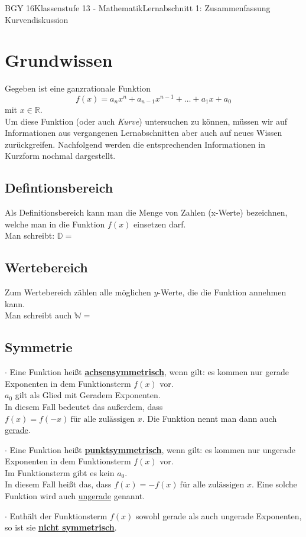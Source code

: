 \documentclass[11pt,twocolumn,oneside,openany,headings=optiontotoc,11pt,numbers=noenddot]{article}
\begin{document}
	\begin{worksheet}{BGY 16}{Klassenstufe 13 - Mathematik}{Lernabschnitt 1: Zusammenfassung Kurvendiskussion}
		\section{Grundwissen}
		Gegeben ist eine ganzrationale Funktion \[f(x) = a_nx^n + a_{n-1}x^{n-1} + \ldots + a_1x + a_0 \] mit \(x\in\mathbb{R}\).\\
		Um diese Funktion (oder auch \textit{Kurve}) untersuchen zu können, müssen wir auf Informationen aus vergangenen Lernabschnitten aber auch auf neues Wissen zurückgreifen. Nachfolgend werden die entsprechenden Informationen in Kurzform nochmal dargestellt.
		\subsection{Defintionsbereich} Als Definitionsbereich kann man die Menge von Zahlen (x-Werte) bezeichnen, welche man in die Funktion \(f(x)\) einsetzen darf.\\
		Man schreibt: \(\mathbb{D} = \)\\
		\subsection{Wertebereich} Zum Wertebereich zählen alle möglichen \(y\)-Werte, die die Funktion annehmen kann.\\
		Man schreibt auch \(\mathbb{W} = \)\\
		\subsection{Symmetrie} \(\cdot\) Eine Funktion heißt \underline{\textbf{achsensymmetrisch}}, wenn gilt: es kommen nur gerade Exponenten in dem Funktionsterm \(f(x)\) vor.\\
		\tiny{\(a_0\) gilt als Glied mit Geradem Exponenten.}\normalsize\\
		In diesem Fall bedeutet das außerdem, dass \(f(x) = f(-x)\ \text{für alle zulässigen } x\). Die Funktion nennt man dann auch \underline{gerade}.\\
		\par\noindent
		\(\cdot\) Eine Funktion heißt \underline{\textbf{punktsymmetrisch}}, wenn gilt: es kommen nur ungerade Exponenten in dem Funktionsterm \(f(x)\) vor.\\
		\tiny{Im Funktionsterm gibt es kein \(a_0\).}\normalsize\\
		In diesem Fall heißt das, dass \(f(x) = -f(x)\ \text{für alle zulässigen } x\). Eine solche Funktion wird auch \underline{ungerade} genannt.\\
		\par\noindent
		\(\cdot\) Enthält der Funktionsterm \(f(x)\) sowohl gerade als auch ungerade Exponenten, so ist sie \underline{\textbf{nicht symmetrisch}}.

\end{worksheet}
\end{document}
